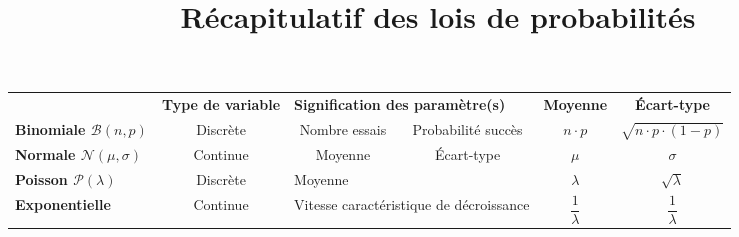 \documentclass[a4paper,12pt,landscape]{scrartcl}
\date{}
\title{Récapitulatif des lois de probabilités}
\begin{document}
\maketitle

\begin{table}[h]
\begin{center}
\begin{tabular}{|l|c|c|c|c|c|}
\cline{1-6}
                                           & \textbf{Type de variable} & \multicolumn{2}{l|}{\textbf{Signification des paramètre(s)}}     & \textbf{Moyenne}     & \textbf{Écart-type}             \\ \cline{1-6}
\textbf{Binomiale $\mathcal{B}(n,p)$}      & Discrète               & Nombre essais              & Probabilité succès              & $n \cdot p$          & $\sqrt{n \cdot p \cdot (1-p)}$  \\ \cline{1-6}
\textbf{Normale $\mathcal{N}(\mu,\sigma)$} & Continue               & Moyenne                    & Écart-type                      & $\mu$                & $\sigma$                        \\ \cline{1-6}
\textbf{Poisson $\mathcal{P}(\lambda)$}    & Discrète               & \multicolumn{2}{l|}{Moyenne}                                 & $\lambda$            & $\sqrt{\lambda}$                \\ \cline{1-6}
\textbf{Exponentielle}                     & Continue               & \multicolumn{2}{l|}{Vitesse caractéristique de décroissance} & $\dfrac{1}{\lambda}$ & $\dfrac{1}{\lambda}$            \\ \cline{1-6}
\end{tabular}
\end{center}
\end{table}
\end{document}
